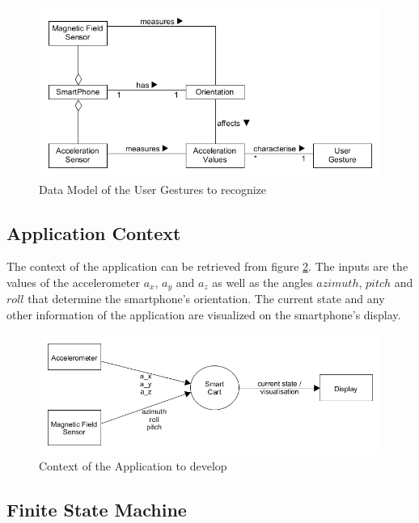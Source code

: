 \begin{figure}
\centering
\captionsetup{justification=centering}
\includegraphics[width=\textwidth]{res/sa/UserGestureDataModel.png}
\caption{Data Model of the User Gestures to recognize}
\label{fig:DataModel}
\end{figure}

\subsection{Application Context}
The context of the application can be retrieved from figure \ref{fig:context}.
The inputs are the values of the accelerometer $a_x$, $a_y$ and $a_z$ as well as
the angles $azimuth$, $pitch$ and $roll$ that determine the smartphone's
orientation. The current state and any other information of the application are
visualized on the smartphone's display.

\begin{figure}
\centering
\captionsetup{justification=centering}
\includegraphics[width=\textwidth]{res/sa/ContextDiagram.png}
\caption{Context of the Application to develop}
\label{fig:context}
\end{figure}

\subsection{Finite State Machine}

